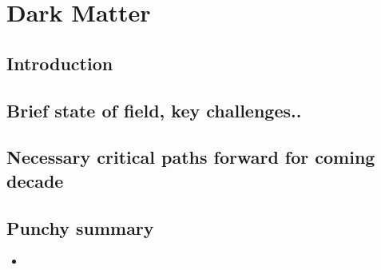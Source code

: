 \section{Dark Matter}

\subsection{Introduction}


\subsection{Brief state of field, key challenges..}


\subsection{Necessary critical paths forward for coming decade}

\subsection{Punchy summary}

\begin{itemize}
    \item 
\end{itemize}